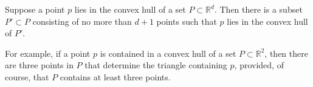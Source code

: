 \documentclass[12pt]{article}
\begin{document}
Suppose a point $p$ lies in the convex hull of a set $P\subset \mathbb{R}^d$. Then there is a subset $P'\subset P$ consisting of no more than $d+1$ points such that $p$ lies in the convex hull of $P'$.

For example, if a point $p$ is contained in a convex hull of a set $P\subset \mathbb{R}^2$, then there are three points in $P$ that determine the triangle containing $p$, provided, of course, that $P$ contains at least three points.
\end{document}
